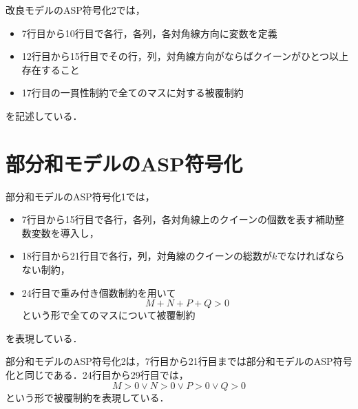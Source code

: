 

\newpage
改良モデルのASP符号化2では，
\begin{itemize}
 \item 7行目から10行目で各行，各列，各対角線方向に変数を定義
 \item 12行目から15行目でその行，列，対角線方向がならばクイーンがひとつ以上存在すること
 \item 17行目の一貫性制約で全てのマスに対する被覆制約
\end{itemize}
を記述している．
\newpage
\section{部分和モデルのASP符号化}



部分和モデルのASP符号化1では，
\begin{itemize}
 \item 7行目から15行目で各行，各列，各対角線上のクイーンの個数を表す補助整数変数を導入し，
 \item 18行目から21行目で各行，列，対角線のクイーンの総数が$k$でなければならない制約， 
 \item 24行目で重み付き個数制約を用いて\[
													  M+N+P+Q>0   
													 \]
という形で全てのマスについて被覆制約
\end{itemize}
を表現している．



\newpage
部分和モデルのASP符号化2は，7行目から21行目までは部分和モデルのASP符号化と同じである．24行目から29行目では，\[
												 M>0 \vee N>0 \vee P>0 \vee Q>0
												  \]
という形で被覆制約を表現している．


